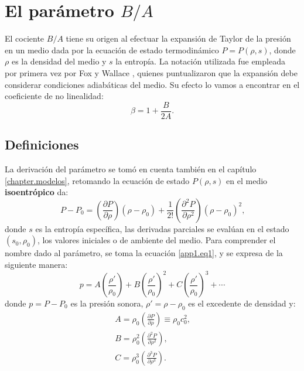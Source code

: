 \chapter{El parámetro $B\slash A$}\label{section.app.ba}
El cociente $B\slash A$ tiene su origen al efectuar la expansión de Taylor de la presión en un medio dada por la ecuación de estado termodinámico $P = P(\rho, s)$, donde $\rho$ es la densidad del medio y $s$ la entropía. La notación utilizada fue empleada por primera vez por Fox y Wallace \cite{nonlinear}, quienes puntualizaron que la expansión debe considerar condiciones adiabáticas del medio. Su efecto lo vamos a encontrar en el coeficiente de no linealidad:
\begin{equation*}
\beta = 1 + \frac{B}{2A}\text{.}
\end{equation*}
\section{Definiciones}
La derivación del parámetro se tomó en cuenta también en el capítulo \ref{chapter.modelos}, retomando la ecuación de estado $P(\rho,s)$ en el medio \textbf{isoentrópico} da:
\begin{equation}
P - P_0 = \left( \frac{\partial P}{\partial \rho}\right)(\rho - \rho_0) + \frac{1}{2!}\left( \frac{\partial^2 P}{\partial \rho^2}\right)(\rho - \rho_0)^2 \label{app1.eq1}\text{,}
\end{equation}
donde $s$ es la entropía específica, las derivadas parciales se evalúan en el estado $(s_0,\rho_0)$, los valores iniciales o de ambiente del medio. Para comprender el nombre dado al parámetro, se toma la ecuación \eqref{app1.eq1}, y se expresa de la siguiente manera: 
\begin{equation}
p = A\left(\frac{\rho'}{\rho_0}\right) + B\left(\frac{\rho'}{\rho_0}\right)^2 + C\left(\frac{\rho'}{\rho_0}\right)^3 + \cdots \label{app.eq2}
\end{equation}
donde $p=P-P_0$ es la presión sonora, $\rho' = \rho-\rho_0$ es el excedente de densidad y:
\begin{subequations}
\begin{align}
A = \rho_0\left( \frac{\partial P}{\partial \rho}\right) \equiv \rho_0c_0^2 \text{,}\label{app1.eq3-1} \\
B = \rho_0^2\left( \frac{\partial^2 P}{\partial \rho^2}\right)\text{,} \label{app1.eq3-2} \\
C = \rho_0^3\left( \frac{\partial^3 P}{\partial \rho^3}\right)\text{.} \label{app1.eq3-3}
\end{align}\label{app1.eq3}
\end{subequations}
